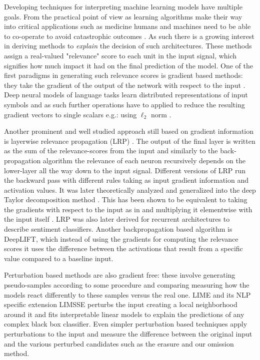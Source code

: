 Developing techniques for interpreting machine learning models have multiple goals.
From the practical point of view as learning algorithms make their way into critical applications
such as medicine humans and machines need to be able to co-operate to avoid catastrophic
outcomes \citep{caruana2015intelligible}. As such there is a growing interest in deriving methods
to \emph{explain} the decision of such architectures.
These methods assign a real-valued "relevance" score to each unit in the input signal,
which signifies how much impact it had on the final prediction of the model.
One of the first paradigms in generating such relevance scores is gradient based methods:
they take the gradient of the output of the network with respect to the input \cite{simonyan2013deep}.
Deep neural models of language tasks learn distributed representations of input symbols
and as such further operations have to applied to reduce the resulting gradient vectors to
single scalars e.g.: using $\ell_2$ norm \citep{bansal2016ask}.

Another prominent and well studied
approach still based on gradient information is layerwise
relevance propagation (LRP) \citep{bach2015pixel}. The output of the final layer
is written as the sum of the relevance-scores from the input and similarly to the back-propagation
algorithm the relevance of each neuron
recursively depends on the lower-layer all the way down to the input signal.
Different versions of LRP run the backward pass with different rules taking as
input gradient information and activation values. It was later theoretically analyzed and generalized
into the deep Taylor decomposition method \citep{binder2016layer}.
This has been shown to be equivalent to taking the
gradients with respect to the input as in \cite{simonyan2013deep} and multiplying it elementwise
with the input itself \citep{shrikumar2017learning}.
LRP was also later derived for recurrent architectures \citep{arras2017explaining} to describe
sentiment classifiers. Another backpropagation based algorithm is DeepLIFT, which instead of
using the gradients for computing the relevance scores it uses the difference between the activations
that result from a specific value compared to a baseline input.

Perturbation based methods are also gradient free: these involve generating
pseudo-samples according to some procedure and comparing measuring how the models
react differently to these samples versus the real one.
LIME \citep{ribeiro2016should} and its NLP specific extension LIMSSE
\citep{poerner2018evaluating} perturbs
the input creating a local neighborhood around it and fits interpretable linear models to explain
the predictions of any complex black box classifier.
Even simpler perturbation based techniques apply perturbations to the input and measure the
difference between the original input and the various perturbed candidates such as the erasure
\citep{li2016understanding} and our omission \citep{Kadar2016} method.

